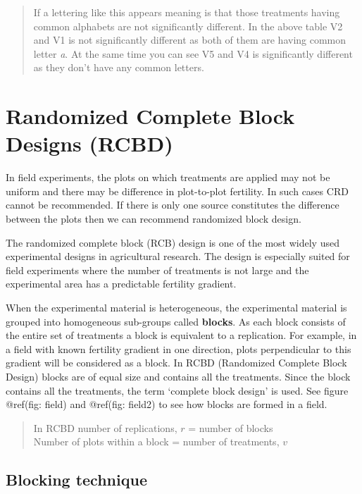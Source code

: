 \documentclass[
]{book}
\begin{document}
\begin{quote}
If a lettering like this appears meaning is that those treatments having common alphabets are not significantly different. In the above table V2
and V1 is not significantly different as both of them are having common
letter \emph{a}. At the same time you can see V5 and V4 is significantly
different as they don't have any common letters.
\end{quote}

\hypertarget{randomized-complete-block-designs-rcbd}{%
\section{Randomized Complete Block Designs (RCBD)}\label{randomized-complete-block-designs-rcbd}}

In field experiments, the plots on which treatments are applied may not be uniform and there may be difference in plot-to-plot fertility. In such cases CRD cannot be
recommended. If there is only one source constitutes the difference between the plots then we can recommend randomized block design.

The randomized complete block (RCB) design is one of the most widely used experimental designs in agricultural research. The design is especially suited for field experiments where the number of treatments is not large and the experimental area has a predictable fertility gradient.

When the experimental material is heterogeneous, the experimental material is grouped into homogeneous sub-groups called \textbf{blocks}. As each block consists of the entire set of treatments a block is equivalent to a replication. For example, in a field with known fertility gradient in one direction, plots perpendicular to this gradient will be considered as a block. In RCBD (Randomized Complete
Block Design) blocks are of equal size and contains all the treatments. Since the block contains all the treatments, the term `complete block design' is used. See figure @ref(fig: field) and @ref(fig: field2) to see how blocks are formed in a field.

\begin{quote}
In RCBD number of replications, \(r\) = number of blocks\\
Number of plots within a block = number of treatments, \(v\)
\end{quote}

\hypertarget{blocking-technique}{%
\subsection{Blocking technique}\label{blocking-technique}}
\end{document}
